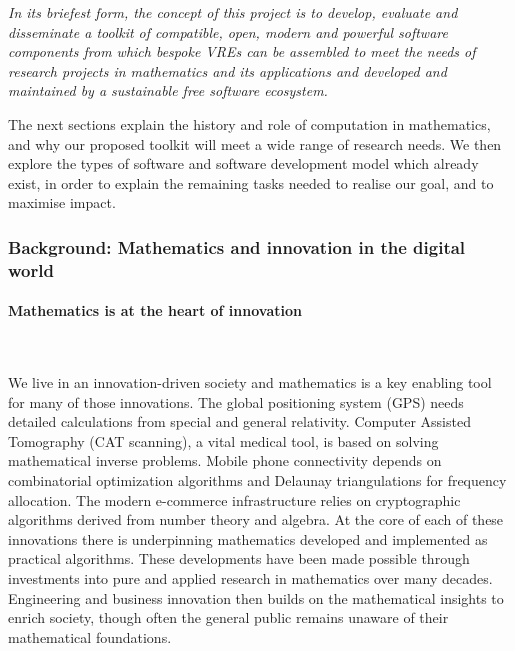 
\begin{center}
\begin{boxedminipage}{.95\textwidth}\em
In its briefest form, the concept of this project is to develop,
evaluate and disseminate a
toolkit of compatible, open, modern and powerful software components from
which bespoke VREs can be assembled to meet the needs of research
projects in mathematics and its applications and developed and
maintained by a sustainable free software ecosystem.
\end{boxedminipage}
\end{center}

The next sections explain the history and role of computation in mathematics,
and why our proposed toolkit will meet a wide range of research
needs. We then explore the types of software and software development
model which already exist, in order to explain the remaining tasks
needed to realise our goal, and to maximise impact.

\subsubsection{Background: Mathematics and innovation in the digital world}\label{sec:innovation}

\paragraph{Mathematics is at the heart of innovation}\

We live in an innovation-driven society and mathematics is a key enabling tool for
many of those innovations.
The global
positioning system (GPS) needs detailed calculations from special and
general relativity.
Computer Assisted Tomography (CAT scanning), a vital medical tool, is based on solving
mathematical inverse problems.
Mobile phone connectivity depends on combinatorial optimization
algorithms and Delaunay triangulations for frequency allocation.
The modern
e-commerce infrastructure relies on cryptographic algorithms
derived from number theory and algebra. At the core of each of these innovations
there is underpinning mathematics developed and implemented as practical
algorithms. These developments have been made possible through investments
into pure and applied research in mathematics over many decades.
Engineering and business innovation then builds on the mathematical
insights to enrich society, though often the
general public remains unaware of their mathematical foundations.


